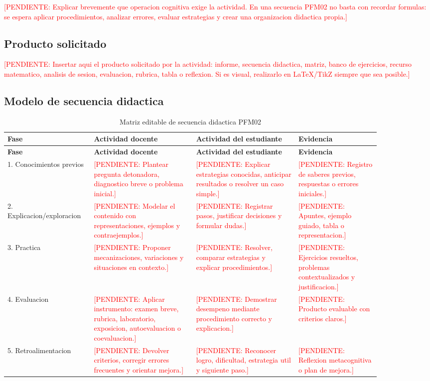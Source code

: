 \documentclass[
	spanish,
	letterpaper, oneside
]{article}
\newcommand{\pendiente}[1]{\textcolor{red}{[PENDIENTE: #1]}}
\begin{document}
\pendiente{Explicar brevemente que operacion cognitiva exige la actividad. En una secuencia PFM02 no basta con recordar formulas: se espera aplicar procedimientos, analizar errores, evaluar estrategias y crear una organizacion didactica propia.}

\subsection{Producto solicitado}

\pendiente{Insertar aqui el producto solicitado por la actividad: informe, secuencia didactica, matriz, banco de ejercicios, recurso matematico, analisis de sesion, evaluacion, rubrica, tabla o reflexion. Si es visual, realizarlo en LaTeX/TikZ siempre que sea posible.}

\subsection{Modelo de secuencia didactica}

\begin{longtable}{@{}p{0.17\linewidth}p{0.25\linewidth}p{0.25\linewidth}p{0.20\linewidth}@{}}
	\caption{Matriz editable de secuencia didactica PFM02}\label{tab:secuencia-pfm02}\\
	\toprule
	\textbf{Fase} & \textbf{Actividad docente} & \textbf{Actividad del estudiante} & \textbf{Evidencia} \\
	\midrule
	\endfirsthead
	\toprule
	\textbf{Fase} & \textbf{Actividad docente} & \textbf{Actividad del estudiante} & \textbf{Evidencia} \\
	\midrule
	\endhead
	1. Conocimientos previos & \pendiente{Plantear pregunta detonadora, diagnostico breve o problema inicial.} & \pendiente{Explicar estrategias conocidas, anticipar resultados o resolver un caso simple.} & \pendiente{Registro de saberes previos, respuestas o errores iniciales.} \\
	2. Explicacion/exploracion & \pendiente{Modelar el contenido con representaciones, ejemplos y contraejemplos.} & \pendiente{Registrar pasos, justificar decisiones y formular dudas.} & \pendiente{Apuntes, ejemplo guiado, tabla o representacion.} \\
	3. Practica & \pendiente{Proponer mecanizaciones, variaciones y situaciones en contexto.} & \pendiente{Resolver, comparar estrategias y explicar procedimientos.} & \pendiente{Ejercicios resueltos, problemas contextualizados y justificacion.} \\
	4. Evaluacion & \pendiente{Aplicar instrumento: examen breve, rubrica, laboratorio, exposicion, autoevaluacion o coevaluacion.} & \pendiente{Demostrar desempeno mediante procedimiento correcto y explicacion.} & \pendiente{Producto evaluable con criterios claros.} \\
	5. Retroalimentacion & \pendiente{Devolver criterios, corregir errores frecuentes y orientar mejora.} & \pendiente{Reconocer logro, dificultad, estrategia util y siguiente paso.} & \pendiente{Reflexion metacognitiva o plan de mejora.} \\
	\bottomrule
\end{longtable}
\end{document}
